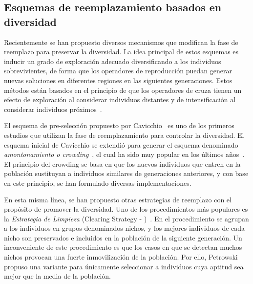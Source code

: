 \subsection{Esquemas de reemplazamiento basados en diversidad}

Recientemente se han propuesto diversos mecanismos que modifican la fase de reemplazo para preservar la diversidad.
%
La idea principal de estos esquemas es inducir un grado de exploración adecuado diversificando a los individuos sobrevivientes,
de forma que los operadores de reproducción puedan generar nuevas soluciones en diferentes regiones en las siguientes generaciones.
%
Estos métodos están basados en el principio de que los operadores de cruza tienen un efecto de exploración al 
considerar individuos distantes y de intensificación al considerar individuos próximos~\cite{eiben1998evolutionary}.

El esquema de pre-selección propuesto por Cavicchio~\cite{grefenstette1986optimization} es uno de los primeros estudios que utilizan 
la fase de reemplazamiento para controlar la diversidad.
%
El esquema inicial de Cavicchio se extendió para generar el esquema denominado \textit{amontonamiento o crowding}~\cite{de1975analysis}, el cual ha sido muy popular 
en los últimos años~\cite{mahfoud1992crowding, mengshoel2014adaptive}.
%
El principio del crowding se basa en que los nuevos individuos que entren en la población sustituyan a individuos similares de generaciones anteriores, y con base
en este principio, se han formulado diversas implementaciones.

En esta misma línea, se han propuesto otras estrategias de reemplazo con el propósito de promover la diversidad.
%
Uno de los procedimientos más populares es la \textit{Estrategia de Limpieza} (Clearing Strategy - \CLR{})~\cite{lozano2008replacement}.
%
En el procedimiento \CLR{} se agrupan a los individuos en grupos denominados nichos, y los mejores individuos de cada nicho son preservados e incluidos 
en la población de la siguiente generación.
%
Un inconveniente de este procedimiento es que los casos en que se detectan muchos nichos provocan una fuerte inmovilización de la población.
%
Por ello, Petrowski~\cite{petrowski1996clearing} propuso una variante para únicamente seleccionar a individuos cuya aptitud sea mejor que la media de la población.


